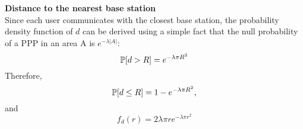 \begin{framed}
	{\bf Distance to the nearest base station}
		\\Since each user communicates with the closest base station, the probability density function of $d$ can be derived using a simple fact that the null probability of a PPP in an area A is $e^{-\lambda |A|}$:
		$$\P[d>R] = e^{-\lambda\pi R^2}$$
		Therefore,
		$$\P[d\le R] = 1-e^{-\lambda\pi R^2},$$
		and
		$$f_d(r) = 2\lambda\pi re^{-\lambda\pi r^2}$$
\end{framed}
\begin{comment}
	\begin{framed}
		\par {\bf Change of variables theorem}
		\\Suppose that $X$ is a general random variable, taking values in a measurable space $(S,\mathcal{I})$, where $\mathcal{I}$ is a $\sigma$-algebra on set $S$. Let $P$ be a probability measure on $(S, \mathcal{I})$. If $g:S\rightarrow\R$ is measurable, then:
		\begin{equation}
			\E(g(X))=\int_Sg(x)dP(x)
		\end{equation}		
	\end{framed}
	
	\begin{framed}
		\par {\bf Radon-Nikodym Theorem}
		\\Suppose that $\mu$ is a positive measure on $(S,\mathcal{I})$, and that the distribution of X is absolutely continuous with respect to $\mu$. Then, $X$ has a probability density function $f$ with respect to $\mu$, such that:
		$$\P(A)=\P(X\in A)=\int_Afd\mu, A\in\mathcal{I}$$
		In this case, the expected value of $g(X)$ is an integral with respect to probability density function:
		\begin{equation}
			\E(g(X))=\int_Sg(x)dP(x)=\int_Sg(x)f(x)d\mu(x)
		\end{equation}
	\end{framed}
\end{comment}
